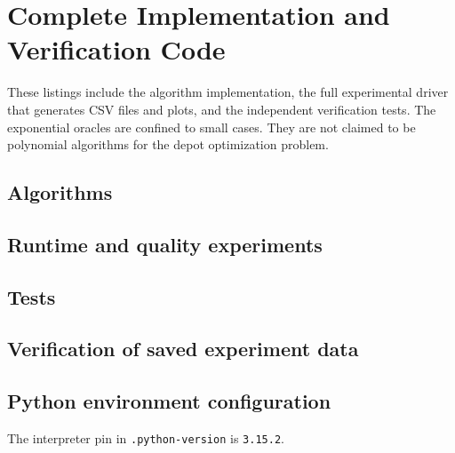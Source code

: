 \documentclass[sigconf,nonacm]{acmart}
\begin{document}
\section{Complete Implementation and Verification Code}\label{app:code}
These listings include the algorithm implementation, the full experimental
driver that generates CSV files and plots, and the independent verification
tests. The exponential oracles are confined to small cases. They are not
claimed to be polynomial algorithms for the depot optimization problem.
\subsection{Algorithms}

\subsection{Runtime and quality experiments}

\subsection{Tests}

\subsection{Verification of saved experiment data}

\subsection{Python environment configuration}
The interpreter pin in \texttt{.python-version} is \texttt{3.15.2}.


\end{document}
